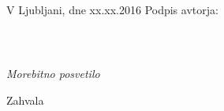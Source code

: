 \vspace{1cm}
V Ljubljani, dne xx.xx.2016 \hspace{2cm} Podpis avtorja:
\newpage

\ \thispagestyle{empty}
\newpage

\thispagestyle{empty}

$\;$ 

\vspace{5cm}
\hfill {\Large \em Morebitno posvetilo}
\thispagestyle{empty}

\vfill
Zahvala
\newpage

\newpage

\renewcommand\thepage{} 
\tableofcontents 
\renewcommand\thepage{\arabic{page}}
\thispagestyle{empty}


\newpage

\setcounter{page}{1}


\ \thispagestyle{empty}
\newpage
